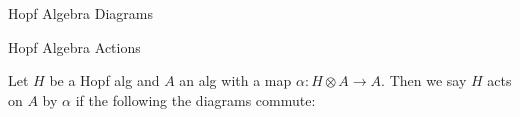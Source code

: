 \documentclass{beamer}
\begin{document}
\begin{frame}[fragile]{Hopf Algebra Diagrams}
\begin{itemize}
\end{itemize}
\end{frame}

\begin{frame}[fragile]{Hopf Algebra Actions}

Let $H$ be a Hopf alg and $A$ an alg with a map $\alpha:H\otimes A\to A$. Then we say $H$ acts on $A$ by $\alpha$ if the following the diagrams commute:


\end{frame}
\end{document}
